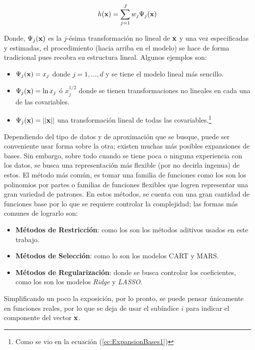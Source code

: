 \documentclass[../Main/Main.tex]{subfiles}
\begin{document}
\begin{align} 
	h(\mathbf{x}) = \sum_{j = 1}^J w_j\Psi_j(\mathbf{x}) \label{ec:ExpansionBases2}
\end{align}

Donde, $\Psi_j(\mathbf{x})$ es la $j$-ésima transformación no lineal de $\mathbf{x}$ y una vez especificadas y estimadas, el procedimiento (hacia arriba en el modelo) se hace de forma tradicional pues recobra su estructura lineal. Algunos ejemplos son:

\begin{itemize}
	\item $\Psi_j(\mathbf{x}) = x_j$ donde $j = 1,\ldots,d$ y se tiene el modelo lineal más sencillo.
	\item $\Psi_j(\mathbf{x}) = \ln x_j$ ó $x_j^{1/2}$ donde se tienen transformaciones no lineales en cada una de las covariables.
	\item $\Psi_j(\mathbf{x}) = ||\mathbf{x}||$ una transformación lineal de todas las covariables.\footnote{Como se vio en la ecuación (\ref{ec:ExpansionBases1})} 
\end{itemize}

Dependiendo del tipo de datos y de aproximación que se busque, puede ser conveniente usar forma sobre la otra; existen muchas más posibles expansiones de bases. Sin embargo, sobre todo cuando se tiene poca o ninguna experiencia con los datos, se busca una representación más flexible (por no decirla ingenua) de estos. El método más común, es tomar una familia de funciones como los son los polinomios por partes o familias de funciones flexibles que logren representar una gran variedad de patrones. En estos métodos, se cuenta con una gran cantidad de funciones base por lo que se requiere controlar la complejidad; las formas más comunes de lograrlo son:

\begin{itemize}
	\item \textbf{Métodos de Restricción}: como los son los métodos aditivos usados en este trabajo.
	\item \textbf{Métodos de Selección}: como lo son los modelos CART y MARS.
	\item \textbf{Métodos de Regularización}: donde se busca controlar los coeficientes, como los son los modelos \textit{Ridge} y  \textit{LASSO}.
\end{itemize}

Simplificando un poco la exposición, por lo pronto, se puede pensar únicamente en funciones reales, por lo que se deja de usar el subíndice $i$ para indicar el componente del vector $\mathbf{x}$.\\
\end{document}
